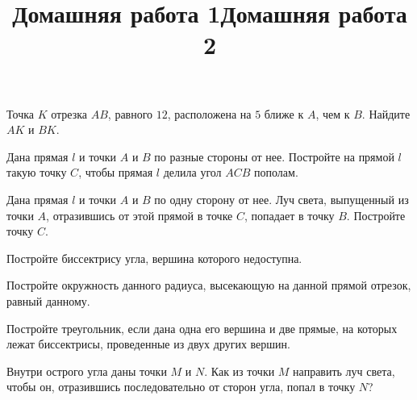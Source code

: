 \newpage
\title{Домашняя работа 1}
\begin{listofex}
	
	\item Точка \( K \) отрезка \( AB \), равного \( 12 \), расположена на \( 5 \) ближе к \( A \), чем к \( B \). Найдите \( AK \) и \( BK \).
	
	\item {}
	
	\item Дана прямая \( l \) и точки \( A \) и \( B \) по разные стороны от нее.
	Постройте на прямой \( l \) такую точку \( C \), чтобы прямая \( l \) делила
	угол \( ACB \) пополам.
	
	\item Дана прямая \( l \) и точки \( A \) и \( B \) по одну сторону от нее.
	Луч света, выпущенный из точки \( A \), отразившись от этой прямой в точке \( C \), попадает в точку \( B \). Постройте точку \( C \).
	
	\item Постройте биссектрису угла, вершина которого недоступна.
	\item {}
	\item {}
	\item {}
	\item {}
	
	\item Постройте окружность данного радиуса, высекающую на данной прямой отрезок, равный данному.
	
	\item Постройте треугольник, если дана одна его вершина и две прямые, на которых лежат биссектрисы, проведенные из двух других вершин.
	
	\item Внутри острого угла даны точки \( M \) и \( N \). Как из точки \( M \) направить луч света, чтобы он, отразившись последовательно от сторон угла, попал в точку \( N \)?
	
\end{listofex}
\newpage
\title{Домашняя работа 2}
